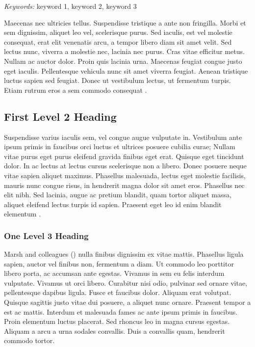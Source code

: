 \documentclass[
    colorlinks=true,        %
    linkcolor=black,          %
    anchorcolor=black,      %
    citecolor=black,         %
    urlcolor=black,          %
    bookmarks=true,         %
    bookmarksopen=false,    %
    bookmarksnumbered=true,  %
    dvipsnames
]{MAE}
\begin{document}
\textit{Keywords:} keyword 1, keyword 2, keyword 3

\vspace{0.75\baselineskip}

\relax
{}\relax
\raggedright
\setlength\parindent{0.5in}


Maecenas nec ultricies tellus. Suspendisse tristique a ante non fringilla. Morbi et sem dignissim, aliquet leo vel, scelerisque purus. Sed iaculis, est vel molestie consequat, erat elit venenatis arcu, a tempor libero diam sit amet velit. Sed lectus nunc, viverra a molestie nec, lacinia nec purus. Cras vitae efficitur metus. Nullam ac auctor dolor. Proin quis lacinia urna. Maecenas feugiat congue justo eget iaculis. Pellentesque vehicula nunc sit amet viverra feugiat. Aenean tristique luctus sapien sed feugiat. Donec ut vestibulum lectus, ut fermentum turpis. Etiam rutrum eros a sem commodo consequat \parencite{ludtke:2008}.

\subsection{First Level 2 Heading}

Suspendisse varius iaculis sem, vel congue augue vulputate in. Vestibulum ante ipsum primis in faucibus orci luctus et ultrices posuere cubilia curae; Nullam vitae purus eget purus eleifend gravida finibus eget erat. Quisque eget tincidunt dolor. In ac lectus at lectus cursus scelerisque non a libero. Donec posuere neque vitae sapien aliquet maximus. Phasellus malesuada, lectus eget molestie facilisis, mauris nunc congue risus, in hendrerit magna dolor sit amet eros. Phasellus nec elit nibh. Sed lacinia, augue ac pretium blandit, quam tortor aliquet massa, aliquet eleifend lectus turpis id sapien. Praesent eget leo id enim blandit elementum \parencite{marsh:2009}.

\subsubsection{One Level 3 Heading}

Marsh and colleagues (\citeyear{marsh:2009}) nulla finibus dignissim ex vitae mattis. Phasellus ligula sapien, auctor vel finibus non, fermentum a diam. Ut commodo leo porttitor libero porta, ac accumsan ante egestas. Vivamus in sem eu felis interdum vulputate. Vivamus ut orci libero. Curabitur nisi odio, pulvinar sed ornare vitae, pellentesque dapibus ligula. Fusce et faucibus dolor. Aliquam erat volutpat. Quisque sagittis justo vitae dui posuere, a aliquet nunc ornare. Praesent tempor a est ac mattis. Interdum et malesuada fames ac ante ipsum primis in faucibus. Proin elementum luctus placerat. Sed rhoncus leo in magna cursus egestas. Aliquam a arcu a urna sodales convallis. Duis a convallis quam, hendrerit commodo tortor.
\end{document}
